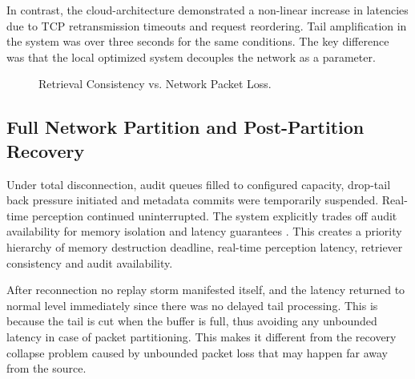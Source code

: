 \documentclass[conference]{IEEEtran}
\begin{document}
In contrast, the cloud-architecture demonstrated a non-linear increase in latencies due to TCP retransmission timeouts and request reordering. Tail amplification in the system was over three seconds for the same conditions. The key difference was that the local optimized system decouples the network as a parameter.

\begin{figure}[htbp]
\centering
{}
\caption{Retrieval Consistency vs. Network Packet Loss.}
\label{fig:survivability}
\end{figure}

\subsection{Full Network Partition and Post-Partition Recovery}
Under total disconnection, audit queues filled to configured capacity, drop-tail back pressure initiated and metadata commits were temporarily suspended. Real-time perception continued uninterrupted. The system explicitly trades off audit availability for memory isolation and latency guarantees \cite{b11}. This creates a priority hierarchy of memory destruction deadline, real-time perception latency, retriever consistency and audit availability.

After reconnection no replay storm manifested itself, and the latency returned to normal level immediately since there was no delayed tail processing. This is because the tail is cut when the buffer is full, thus avoiding any unbounded latency in case of packet partitioning. This makes it different from the recovery collapse problem caused by unbounded packet loss that may happen far away from the source.
\end{document}
